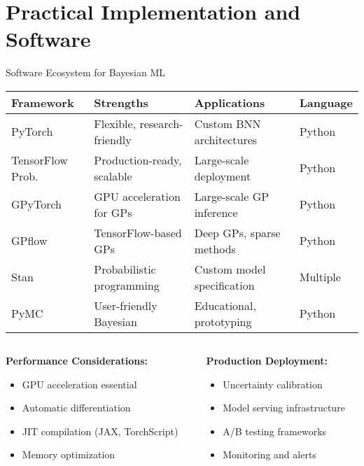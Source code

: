 \documentclass[aspectratio=169,11pt]{beamer}
\begin{document}
\section{Practical Implementation and Software}

\begin{frame}{Software Ecosystem for Bayesian ML}
\begin{table}
\centering
\small
\begin{tabular}{p{2.5cm}p{3cm}p{3.5cm}p{2.5cm}}
\toprule
\textbf{Framework} & \textbf{Strengths} & \textbf{Applications} & \textbf{Language} \\
\midrule
PyTorch & Flexible, research-friendly & Custom BNN architectures & Python \\
\midrule
TensorFlow Prob. & Production-ready, scalable & Large-scale deployment & Python \\
\midrule
GPyTorch & GPU acceleration for GPs & Large-scale GP inference & Python \\
\midrule
GPflow & TensorFlow-based GPs & Deep GPs, sparse methods & Python \\
\midrule
Stan & Probabilistic programming & Custom model specification & Multiple \\
\midrule
PyMC & User-friendly Bayesian & Educational, prototyping & Python \\
\bottomrule
\end{tabular}
\end{table}

\begin{columns}
\begin{column}{0.5\textwidth}
\textbf{Performance Considerations:}
\begin{itemize}
\item GPU acceleration essential
\item Automatic differentiation
\item JIT compilation (JAX, TorchScript)
\item Memory optimization
\end{itemize}
\end{column}
\begin{column}{0.5\textwidth}
\textbf{Production Deployment:}
\begin{itemize}
\item Uncertainty calibration
\item Model serving infrastructure
\item A/B testing frameworks
\item Monitoring and alerts
\end{itemize}
\end{column}
\end{columns}
\end{frame}
\end{document}
